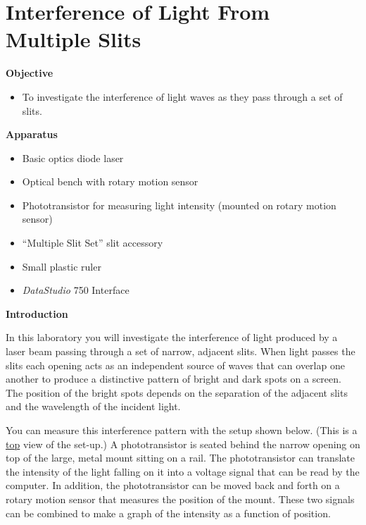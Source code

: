 
\section{Interference of Light From Multiple Slits}
\label{interference_lab}
\makelabheader %

\textbf{Objective}

\begin{itemize}
\item To investigate the interference of light waves as they pass through
a set of slits. 
\end{itemize}
\textbf{Apparatus}

\begin{itemize}
\item Basic optics diode laser
\item Optical bench with rotary motion sensor
\item Phototransistor for measuring light intensity (mounted on rotary motion sensor)
\item ``Multiple Slit Set'' slit accessory
\item Small plastic ruler
\item {\it DataStudio} 750 Interface
\end{itemize}
\textbf{Introduction}

In this laboratory you will investigate the interference of light
produced by a laser beam passing through a set of narrow, adjacent
slits. When light passes the slits each opening acts as an independent
source of waves that can overlap one another to produce a distinctive
pattern of bright and dark spots on a screen. The position of the
bright spots depends on the separation of the adjacent slits and the
wavelength of the incident light. 

You can measure this interference pattern with the setup shown below. 
(This is a \underline{top} view of the set-up.) 
A phototransistor is seated behind the narrow opening on top of the large,
metal mount sitting on a rail. The phototransistor can translate the intensity 
of the light falling on it into a voltage signal that can be read by the
computer. In addition, the phototransistor can be moved back and
forth on a rotary motion sensor that measures the position of the 
mount. These two signals can be combined to
make a graph of the intensity as a function of position.

